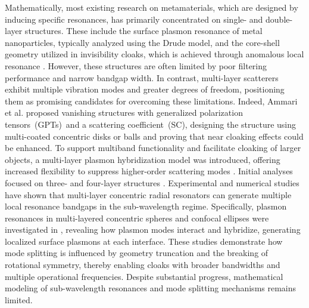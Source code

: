 \documentclass[10pt,reqno,oneside]{amsart}%
\theoremstyle{definition}
\theoremstyle{remark}
\numberwithin{equation}{section}
\numberwithin{equation}{section}
\begin{document}
Mathematically, most existing research on metamaterials, which are designed by inducing specific resonances, has primarily concentrated on single- and double-layer structures. These include the surface plasmon resonance of metal nanoparticles, typically analyzed using the Drude model, and the core-shell geometry utilized in invisibility cloaks, which is achieved through anomalous local resonance \cite{2018Kangelasticity,Kangelasticity,SpectralTheory}. However, these structures are often limited by poor filtering performance and narrow bandgap width. In contrast, multi-layer scatterers exhibit multiple vibration modes and greater degrees of freedom, positioning them as promising candidates for overcoming these limitations. Indeed, Ammari et al. \cite{GPT1,GPT2,GPT3,SC1,SC2} proposed vanishing structures with generalized polarization tensors~(GPTs)~and a scattering coefficient~(SC), designing the structure using multi-coated concentric disks or balls and proving that near cloaking effects could be enhanced. To support multiband functionality and facilitate cloaking of larger objects, a multi-layer plasmon hybridization model was introduced, offering increased flexibility to suppress higher-order scattering modes \cite{Multifrequency,Invisibility}. Initial analyses focused on three- and four-layer structures \cite{Dandf1,Kulkarni,Plasmonhybridization}. Experimental and numerical studies \cite{multi5,multi7,multi8,multi9} have shown that multi-layer concentric radial resonators can generate multiple local resonance bandgaps in the sub-wavelength regime. Specifically, plasmon resonances in multi-layered concentric spheres and confocal ellipses were investigated in \cite{Dandf2,Kmodesplitting,Ksubwavelength,Wsubwavelength,Kbandgap}, revealing how plasmon modes interact and hybridize, generating localized surface plasmons at each interface. These studies demonstrate how mode splitting is influenced by geometry truncation and the breaking of rotational symmetry, thereby enabling cloaks with broader bandwidths and multiple operational frequencies. Despite substantial progress, mathematical modeling of sub-wavelength resonances and mode splitting mechanisms remains limited.
\end{document}
